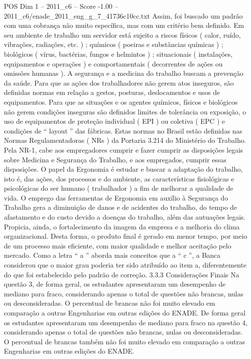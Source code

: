 \begin{textsample}{POS Dim 1 – 2011\_c6 – Score -1.00 – 2011\_c6/enade\_2011\_eng\_g\_7\_41736c10cc.txt}
Assim, foi buscado um padrão com uma cobrança não muito específica, mas com um critério bem definido.
Em seu ambiente de trabalho um servidor está sujeito a riscos físicos ( calor, ruído, vibrações, radiações, etc. ) ; químicos ( poeiras e substâncias químicas ) ; biológicos ( vírus, bactérias, fungos e helmintos ) ; situacionais ( instalações, equipamentos e operações ) e comportamentais ( decorrentes de ações ou omissões humanas ).
A segurança e a medicina do trabalho buscam a prevenção da saúde.
Para que as ações dos trabalhadores não gerem atos inseguros, são definidas normas em relação a gestos, posturas, deslocamentos e usos de equipamentos.
Para que as situações e os agentes químicos, físicos e biológicos não gerem condições inseguras são definidos limites de tolerância ou exposição, o uso de equipamentos de proteção individual ( EPI ) ou coletiva ( EPC ) e condições de “ layout ” das fábricas.
Estas normas no Brasil estão definidas nas Normas Regulamentadoras ( NRs ) da Portaria 3.214 do Ministério do Trabalho.
Pela NR-1, cabe aos empregadores cumprir e fazer cumprir as disposições legais sobre Medicina e Segurança do Trabalho, e aos empregados, cumprir essas disposições.
O papel da Ergonomia é estudar e buscar a adaptação do trabalho, isto é, das ações, dos processos e do ambiente, as características fisiológicas e psicológicas do ser humano ( trabalhador ) a fim de melhorar a qualidade de vida.
O emprego das ferramentas de Ergonomia em auxílio à Segurança do Trabalho gera a diminuição de danos e de acidentes do trabalho, do tempo de afastamento e do custo devido a doenças do trabalho, além das autuações legais.
Propicia, ainda, o fortalecimento da imagem da empresa e a melhoria do clima organizacional.
Desta forma, o produto final é gerado em menor tempo, por meio de um processo mais eficiente, com maior qualidade e melhor aceitação pelo mercado.
Como a letra “ a ” aborda mais conceitos que a “ c ”, a Banca considerou que o maior grau poderia ter sido atribuído ao item a, diferentemente do que foi estabelecido pelo padrão de correção. 3.3.3 Considerações Finais Na questão 3, de forma geral, os estudantes apresentaram um desempenho de mediano para fraco, considerando apenas o total de questões não brancas, nulas ou desconsideradas.
O percentual de brancas não foi muito elevado em comparação a outras Engenharias em outras edições do ENADE.
De forma geral os estudantes apresentaram um desempenho de mediano para fraco na questão 4, considerando apenas o total de questões não brancas, nulas ou desconsideradas.
O percentual de brancas também não foi muito elevado em comparação a outras Engenharias em outras edições do ENADE.

\end{textsample}
